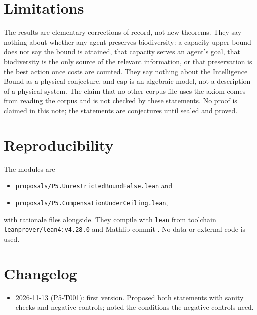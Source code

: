 \documentclass[11pt]{article}
\theoremstyle{remark}
\begin{document}
\section{Limitations}
The results are elementary corrections of record, not new theorems. They say nothing about
whether any agent preserves biodiversity: a capacity upper bound does not say the bound is
attained, that capacity serves an agent's goal, that biodiversity is the only source of the
relevant information, or that preservation is the best action once costs are counted. They say
nothing about the Intelligence Bound as a physical conjecture, and $\mathrm{cap}$ is an algebraic
model, not a description of a physical system. The claim that no other corpus file uses the
axiom comes from reading the corpus and is not checked by these statements. No proof is
claimed in this note; the statements are conjectures until sealed and proved.

\section{Reproducibility}
The modules are
\begin{itemize}
\item \texttt{proposals/P5.UnrestrictedBoundFalse.lean} and
\item \texttt{proposals/P5.CompensationUnderCeiling.lean},
\end{itemize}
with rationale files alongside. They compile
with \texttt{lean} from toolchain \texttt{leanprover/lean4:v4.28.0} and Mathlib commit
. No data or external code is used.

\section{Changelog}
\begin{itemize}
\item 2026-11-13 (P5-T001): first version. Proposed both statements with sanity checks and
negative controls; noted the conditions the negative controls need.
\end{itemize}



\end{document}
